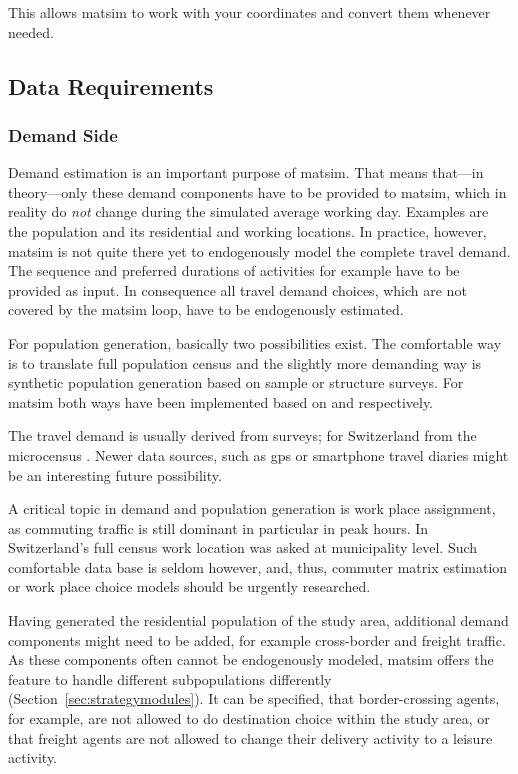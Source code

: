 This allows \gls{matsim} to work with your coordinates and convert them whenever needed. 

\subsection{Data Requirements}
\subsubsection{Demand Side}
Demand estimation is 
an important purpose of \gls{matsim}. That means that---in theory---only these demand components have to be provided to \gls{matsim}, which in reality do \emph{not} change during the simulated average working day. Examples are the population and its residential and working locations. In practice, however, \gls{matsim} is not quite there yet to endogenously model the complete travel demand. The sequence and preferred durations of activities for example have to be provided as input. In consequence all travel demand choices, which are not covered by the \gls{matsim} loop, have to be endogenously estimated. 

For population generation, basically two possibilities exist. The comfortable way is to translate full population census and the slightly more demanding way is synthetic population generation \citep[e.g.,][]{GuoBhat_TRR_2007} based on sample or structure surveys. For \gls{matsim} both ways have been implemented based on \citet[][]{BfS_VZ_2000} and \citet[][]{Mueller_unpub_STRC_2011} respectively.

The travel demand is usually derived from surveys; for Switzerland from the \gls{microcensus} \citep[][]{BfS-MZ2005_manual_2006}. Newer data sources, such as \gls{gps} or smartphone travel diaries might be an interesting future possibility.

A critical topic in demand and population generation is work place assignment, as commuting traffic is still dominant in particular in peak hours. In Switzerland's full census work location was asked at municipality level. Such comfortable data base is seldom however, and, thus, commuter matrix estimation or work place choice models should be urgently researched.

Having generated the residential population of the study area, additional demand components might need to be added, for example cross-border and freight traffic. As these components often cannot be endogenously modeled, \gls{matsim} offers the feature to handle different subpopulations differently (Section~\ref{sec:strategymodules}). It can be specified, that border-crossing agents, for example, are not allowed to do destination choice within the study area, or that freight agents are not allowed to change their delivery activity to a leisure activity.

